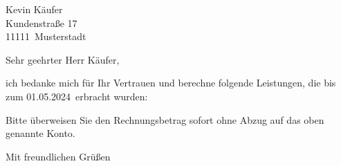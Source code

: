 \documentclass[version=last,fontsize=12pt,DIV=15]{scrlttr2}
\newcommand{\InvoiceYear}{2024} %
\newcommand{\InvoiceMonth}{05}  %
\newcommand{\InvoiceDay}{01}    %
\newcommand{\BuyerName}{Kevin Käufer}
\newcommand{\BuyerAddress}{Kundenstraße 17}
\newcommand{\BuyerPostcode}{11111}
\newcommand{\BuyerCity}{Musterstadt}
\begin{document}
  \begin{letter}{\BuyerName\\
      \BuyerAddress\\
      \BuyerPostcode\ \BuyerCity
    }
    \opening{Sehr geehrter Herr Käufer,}

    ich bedanke mich für Ihr Vertrauen und berechne folgende Leistungen, die
    bis zum \InvoiceDay.\InvoiceMonth.\InvoiceYear\ erbracht wurden:


    \PrintInvoiceTabular

    \noindent Bitte überweisen Sie den Rechnungsbetrag sofort ohne Abzug auf
      das oben genannte Konto.
    \closing{Mit freundlichen Grüßen}
  \end{letter}
\end{document}
